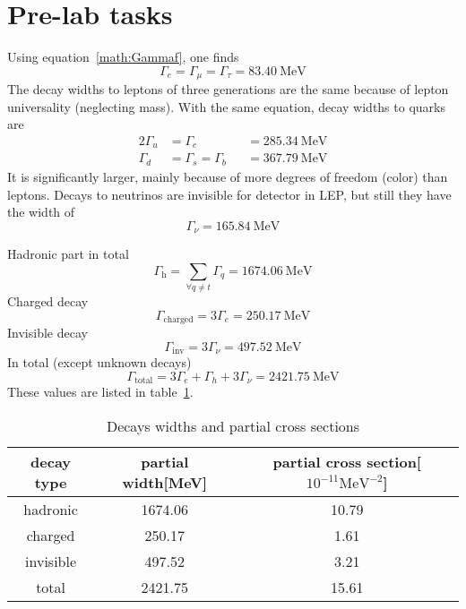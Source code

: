 \section{Pre-lab tasks}
Using equation~\ref{math:Gammaf}, one finds
\begin{equation}
	\Gamma_e = \Gamma_\mu = \Gamma_\tau = \SI{83.40}{\mega\eV}
\end{equation}
The decay widths to leptons of three generations are the same because of lepton universality (neglecting mass). With the same equation, decay widths to quarks are
\begin{alignat*}{2}
	\Gamma_u &= \Gamma_c &&= \SI{285.34}{\mega\eV} \\
	\Gamma_d &= \Gamma_s = \Gamma_b &&= \SI{367.79}{\mega\eV}
\end{alignat*}
It is significantly larger, mainly because of more degrees of freedom (color) than leptons. Decays to neutrinos are invisible for detector in LEP, but still they have the width of
\begin{equation}
	\Gamma_{\nu} = \SI{165.84}{\mega\eV}
	\label{math:Gammanu}
\end{equation}

Hadronic part in total
\begin{equation}
	\Gamma_\text{h} = \sum_{\forall q\neq t} \Gamma_q = \SI{1674.06}{\mega\eV}
\end{equation}
Charged decay
\begin{equation}
	\Gamma_\text{charged} = 3 \Gamma_e = \SI{250.17}{\mega\eV}
\end{equation}
Invisible decay
\begin{equation}
	\Gamma_\text{inv} = 3\Gamma_\nu = \SI{497.52}{\mega\eV}
\end{equation}
In total (except unknown decays)
\begin{equation}
	\Gamma_\text{total} = 3\Gamma_e + \Gamma_h + 3\Gamma_\nu = \SI{2421.75}{\mega\eV}
\end{equation}
These values are listed in table~\ref{tab:p_cross_theo}.
\begin{table}[ht]
	\centering
	\begin{tabular}{ccc}
		\toprule
		decay type & partial width[\si{\mega\eV}]  & partial cross section[$10^{-11}\si{\mega\eV\tothe{-2}}$] 	 \\
		\midrule
		hadronic & \num{1674.06} & \num{10.79} \\
		charged & \num{250.17} & \num{1.61} \\
		invisible & \num{497.52} & \num{3.21}  \\
		total & \num{2421.75} & \num{15.61} \\
		\bottomrule
	\end{tabular}
	\caption{Decays widths and partial cross sections\label{tab:p_cross_theo}}
\end{table}


